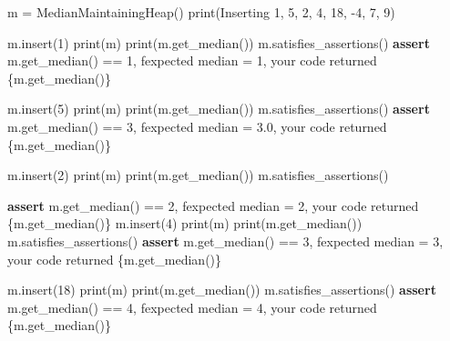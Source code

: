 \documentclass[
]{article}
\newenvironment{Shaded}{}{}
\newcommand{\BuiltInTok}[1]{\textcolor[rgb]{0.00,0.50,0.00}{#1}}
\newcommand{\ControlFlowTok}[1]{\textcolor[rgb]{0.00,0.44,0.13}{\textbf{#1}}}
\newcommand{\DecValTok}[1]{\textcolor[rgb]{0.25,0.63,0.44}{#1}}
\newcommand{\NormalTok}[1]{#1}
\newcommand{\OperatorTok}[1]{\textcolor[rgb]{0.40,0.40,0.40}{#1}}
\newcommand{\SpecialCharTok}[1]{\textcolor[rgb]{0.25,0.44,0.63}{#1}}
\newcommand{\SpecialStringTok}[1]{\textcolor[rgb]{0.73,0.40,0.53}{#1}}
\newcommand{\StringTok}[1]{\textcolor[rgb]{0.25,0.44,0.63}{#1}}
\begin{document}
\begin{Shaded}
\begin{Highlighting}[]
\NormalTok{m }\OperatorTok{=}\NormalTok{ MedianMaintainingHeap()}
\BuiltInTok{print}\NormalTok{(}\StringTok{\textquotesingle{}Inserting 1, 5, 2, 4, 18, {-}4, 7, 9\textquotesingle{}}\NormalTok{)}

\NormalTok{m.insert(}\DecValTok{1}\NormalTok{)}
\BuiltInTok{print}\NormalTok{(m)}
\BuiltInTok{print}\NormalTok{(m.get\_median())}
\NormalTok{m.satisfies\_assertions()}
\ControlFlowTok{assert}\NormalTok{ m.get\_median() }\OperatorTok{==} \DecValTok{1}\NormalTok{,  }\SpecialStringTok{f\textquotesingle{}expected median = 1, your code returned }\SpecialCharTok{\{}\NormalTok{m}\SpecialCharTok{.}\NormalTok{get\_median()}\SpecialCharTok{\}}\SpecialStringTok{\textquotesingle{}}

\NormalTok{m.insert(}\DecValTok{5}\NormalTok{)}
\BuiltInTok{print}\NormalTok{(m)}
\BuiltInTok{print}\NormalTok{(m.get\_median())}
\NormalTok{m.satisfies\_assertions()}
\ControlFlowTok{assert}\NormalTok{ m.get\_median() }\OperatorTok{==} \DecValTok{3}\NormalTok{,  }\SpecialStringTok{f\textquotesingle{}expected median = 3.0, your code returned }\SpecialCharTok{\{}\NormalTok{m}\SpecialCharTok{.}\NormalTok{get\_median()}\SpecialCharTok{\}}\SpecialStringTok{\textquotesingle{}}

\NormalTok{m.insert(}\DecValTok{2}\NormalTok{)}
\BuiltInTok{print}\NormalTok{(m)}
\BuiltInTok{print}\NormalTok{(m.get\_median())}
\NormalTok{m.satisfies\_assertions()}

\ControlFlowTok{assert}\NormalTok{ m.get\_median() }\OperatorTok{==} \DecValTok{2}\NormalTok{,  }\SpecialStringTok{f\textquotesingle{}expected median = 2, your code returned }\SpecialCharTok{\{}\NormalTok{m}\SpecialCharTok{.}\NormalTok{get\_median()}\SpecialCharTok{\}}\SpecialStringTok{\textquotesingle{}}
\NormalTok{m.insert(}\DecValTok{4}\NormalTok{)}
\BuiltInTok{print}\NormalTok{(m)}
\BuiltInTok{print}\NormalTok{(m.get\_median())}
\NormalTok{m.satisfies\_assertions()}
\ControlFlowTok{assert}\NormalTok{ m.get\_median() }\OperatorTok{==} \DecValTok{3}\NormalTok{,  }\SpecialStringTok{f\textquotesingle{}expected median = 3, your code returned }\SpecialCharTok{\{}\NormalTok{m}\SpecialCharTok{.}\NormalTok{get\_median()}\SpecialCharTok{\}}\SpecialStringTok{\textquotesingle{}}

\NormalTok{m.insert(}\DecValTok{18}\NormalTok{)}
\BuiltInTok{print}\NormalTok{(m)}
\BuiltInTok{print}\NormalTok{(m.get\_median())}
\NormalTok{m.satisfies\_assertions()}
\ControlFlowTok{assert}\NormalTok{ m.get\_median() }\OperatorTok{==} \DecValTok{4}\NormalTok{,  }\SpecialStringTok{f\textquotesingle{}expected median = 4, your code returned }\SpecialCharTok{\{}\NormalTok{m}\SpecialCharTok{.}\NormalTok{get\_median()}\SpecialCharTok{\}}\SpecialStringTok{\textquotesingle{}}


\end{Highlighting}
\end{Shaded}
\end{document}
